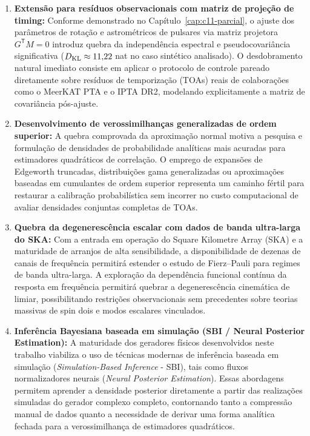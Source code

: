 \begin{enumerate}
  \item \textbf{Extensão para resíduos observacionais com matriz de projeção de timing:} 
  Conforme demonstrado no Capítulo~\ref{cap:c11-parcial}, o ajuste dos parâmetros de rotação e astrométricos de pulsares via matriz projetora $G^{\mathsf T}M = 0$ introduz quebra da independência espectral e pseudocovariância significativa ($D_{\rm KL} \approx 11{,}22$ nat no caso sintético analisado). O desdobramento natural imediato consiste em aplicar o protocolo de controle pareado diretamente sobre resíduos de temporização (TOAs) reais de colaborações como o MeerKAT PTA e o IPTA DR2, modelando explicitamente a matriz de covariância pós-ajuste.

  \item \textbf{Desenvolvimento de verossimilhanças generalizadas de ordem superior:} 
  A quebra comprovada da aproximação normal motiva a pesquisa e formulação de densidades de probabilidade analíticas mais acuradas para estimadores quadráticos de correlação. O emprego de expansões de Edgeworth truncadas, distribuições gama generalizadas ou aproximações baseadas em cumulantes de ordem superior representa um caminho fértil para restaurar a calibração probabilística sem incorrer no custo computacional de avaliar densidades conjuntas completas de TOAs.

  \item \textbf{Quebra da degenerescência escalar com dados de banda ultra-larga do SKA:} 
  Com a entrada em operação do Square Kilometre Array (SKA) e a maturidade de arranjos de alta sensibilidade, a disponibilidade de dezenas de canais de frequência permitirá estender o estudo de Fierz--Pauli para regimes de banda ultra-larga. A exploração da dependência funcional contínua da resposta em frequência permitirá quebrar a degenerescência cinemática de limiar, possibilitando restrições observacionais sem precedentes sobre teorias massivas de spin dois e modos escalares vinculados.

  \item \textbf{Inferência Bayesiana baseada em simulação (SBI / Neural Posterior Estimation):} 
  A maturidade dos geradores físicos desenvolvidos neste trabalho viabiliza o uso de técnicas modernas de inferência baseada em simulação (\emph{Simulation-Based Inference} - SBI), tais como fluxos normalizadores neurais (\emph{Neural Posterior Estimation}). Essas abordagens permitem aprender a densidade posterior diretamente a partir das realizações simuladas do gerador complexo completo, contornando tanto a compressão manual de dados quanto a necessidade de derivar uma forma analítica fechada para a verossimilhança de estimadores quadráticos.


\end{enumerate}
